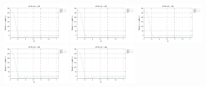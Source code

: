 \noindent
\includegraphics[width=3.5cm]{python_codes/fieldstone_152/RESULTS/exp3/d_t_16_m2}
\includegraphics[width=3.5cm]{python_codes/fieldstone_152/RESULTS/exp3/d_t_16_m3}
\includegraphics[width=3.5cm]{python_codes/fieldstone_152/RESULTS/exp3/d_t_16_m4}
\includegraphics[width=3.5cm]{python_codes/fieldstone_152/RESULTS/exp3/d_t_16_m5}
\includegraphics[width=3.5cm]{python_codes/fieldstone_152/RESULTS/exp3/d_t_16_m6}

